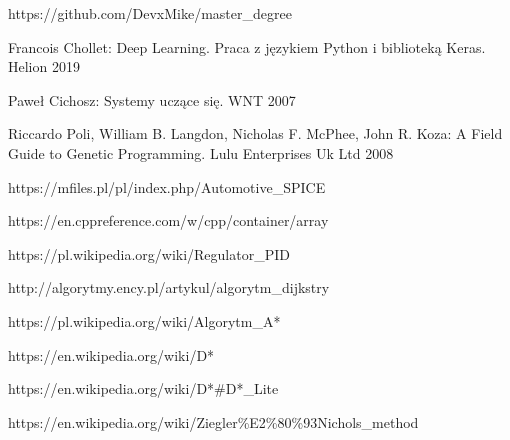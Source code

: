 \documentclass[12pt,twoside]{article}
\begin{document}
\clearpage


\begin{thebibliography}{12}
 https://github.com/DevxMike/master\_degree

 Francois Chollet: Deep Learning. Praca z językiem Python i biblioteką Keras. Helion 2019

 Paweł Cichosz: Systemy uczące się. WNT 2007 

  Riccardo Poli, William B. Langdon, Nicholas F. McPhee, John R. Koza: A Field Guide to Genetic Programming. Lulu Enterprises Uk Ltd 2008

 https://mfiles.pl/pl/index.php/Automotive\_SPICE

 https://en.cppreference.com/w/cpp/container/array

 https://pl.wikipedia.org/wiki/Regulator\_PID

 http://algorytmy.ency.pl/artykul/algorytm\_dijkstry

 https://pl.wikipedia.org/wiki/Algorytm\_A*

 https://en.wikipedia.org/wiki/D*

 https://en.wikipedia.org/wiki/D*\#D*\_Lite

 https://en.wikipedia.org/wiki/Ziegler\%E2\%80\%93Nichols\_method

\end{thebibliography}

\clearpage

\makesummary
\end{document}
